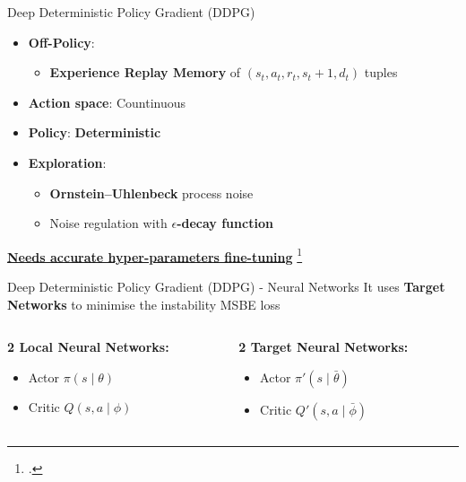 \documentclass[aspectratio=169]{beamer}
\begin{document}
\begin{frame}{Deep Deterministic Policy Gradient (DDPG)}
	\centering
	\begin{itemize}
		\item \textbf{Off-Policy}:\begin{itemize}
			\item \alert{\textbf{Experience Replay Memory}} of $(s_t, a_t, r_t, s_t+1, d_t)$ tuples
		\end{itemize}
		\item \textbf{Action space}: Countinuous
		\item \textbf{Policy}: \alert{\textbf{Deterministic}}
		\item \textbf{Exploration}: \begin{itemize}
			\item \alert{\textbf{Ornstein–Uhlenbeck}} process noise
			\item Noise regulation with \alert{\textbf{$\epsilon$-decay function}}
		\end{itemize}
	\end{itemize}
\textbf{\underline{Needs accurate hyper-parameters fine-tuning}}
	\footcite*{lillicrap2015continuous}
\end{frame}

\begin{frame}{Deep Deterministic Policy Gradient (DDPG) - Neural Networks}
	\centering
	It uses \textbf{Target Networks} to minimise the instability MSBE loss
	\vspace{10mm}
	\begin{columns}
	\begin{column}{0.5\linewidth}
			\textbf{2 Local Neural Networks:}
		\begin{itemize}
			\item Actor $\pi(s \;|\; \theta)$ 
			\item Critic $Q(s, a \;|\; \phi)$
		\end{itemize}
	\end{column}
	\begin{column}{0.5\textwidth}
\textbf{2 Target Neural Networks:}
		\begin{itemize}
			\item Actor $\pi'(s \;|\; \bar{\theta})$
			\item Critic $Q'(s, a \;|\; \bar{\phi})$
		\end{itemize}
	\end{column}
\end{columns}
\end{frame}
\end{document}
